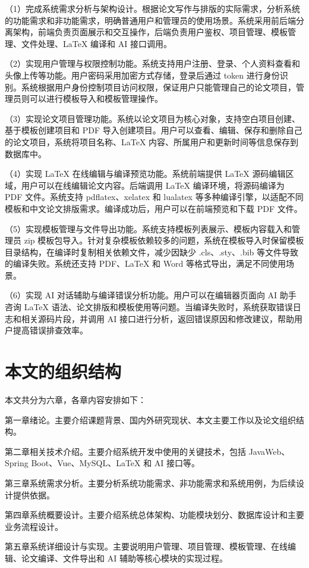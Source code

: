 \documentclass{xduugthesis}
\begin{document}
（1）完成系统需求分析与架构设计。根据论文写作与排版的实际需求，分析系统的功能需求和非功能需求，明确普通用户和管理员的使用场景。系统采用前后端分离架构，前端负责页面展示和交互操作，后端负责用户鉴权、项目管理、模板管理、文件处理、LaTeX 编译和 AI 接口调用。

（2）实现用户管理与权限控制功能。系统支持用户注册、登录、个人资料查看和头像上传等功能。用户密码采用加密方式存储，登录后通过 token 进行身份识别。系统根据用户身份控制项目访问权限，保证用户只能管理自己的论文项目，管理员则可以进行模板导入和模板管理操作。

（3）实现论文项目管理功能。系统以论文项目为核心对象，支持空白项目创建、基于模板创建项目和 PDF 导入创建项目。用户可以查看、编辑、保存和删除自己的论文项目，系统将项目名称、LaTeX 内容、所属用户和更新时间等信息保存到数据库中。

（4）实现 LaTeX 在线编辑与编译预览功能。系统前端提供 LaTeX 源码编辑区域，用户可以在线编辑论文内容。后端调用 LaTeX 编译环境，将源码编译为 PDF 文件。系统支持 pdflatex、xelatex 和 lualatex 等多种编译引擎，以适配不同模板和中文论文排版需求。编译成功后，用户可以在前端预览和下载 PDF 文件。

（5）实现模板管理与文件导出功能。系统支持模板列表展示、模板内容载入和管理员 zip 模板包导入。针对复杂模板依赖较多的问题，系统在模板导入时保留模板目录结构，在编译时复制相关依赖文件，减少因缺少 .cls、.sty、.bib 等文件导致的编译失败。系统还支持 PDF、LaTeX 和 Word 等格式导出，满足不同使用场景。

（6）实现 AI 对话辅助与编译错误分析功能。用户可以在编辑器页面向 AI 助手咨询 LaTeX 语法、论文排版和模板使用等问题。当编译失败时，系统获取错误日志和相关源码片段，并调用 AI 接口进行分析，返回错误原因和修改建议，帮助用户提高错误排查效率。

\section{本文的组织结构}
本文共分为六章，各章内容安排如下：

第一章绪论。主要介绍课题背景、国内外研究现状、本文主要工作以及论文组织结构。

第二章相关技术介绍。主要介绍系统开发中使用的关键技术，包括 JavaWeb、Spring Boot、Vue、MySQL、LaTeX 和 AI 接口等。

第三章系统需求分析。主要分析系统功能需求、非功能需求和系统用例，为后续设计提供依据。

第四章系统概要设计。主要介绍系统总体架构、功能模块划分、数据库设计和主要业务流程设计。

第五章系统详细设计与实现。主要说明用户管理、项目管理、模板管理、在线编辑、论文编译、文件导出和 AI 辅助等核心模块的实现过程。
\end{document}
